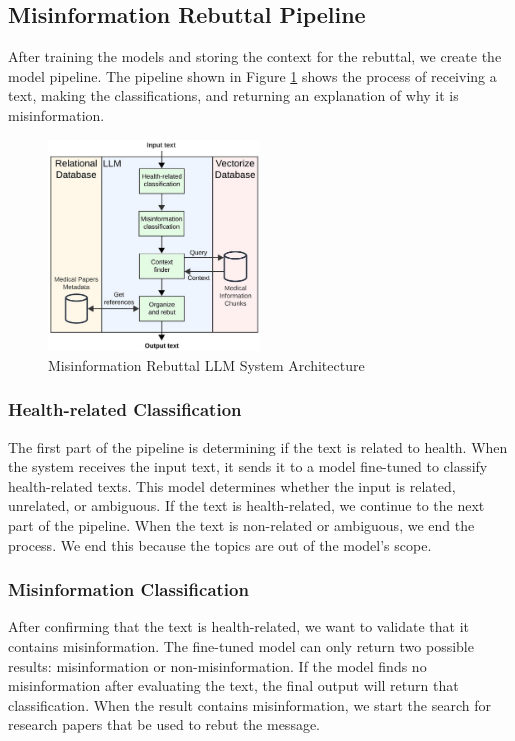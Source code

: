 \subsection{Misinformation Rebuttal Pipeline}
After training the models and storing the context for the rebuttal, we create the model pipeline. The pipeline shown in Figure \ref{fig:llm} shows the process of receiving a text, making the classifications, and returning an explanation of why it is misinformation.

\begin{figure}[h]
	\begin{center}
		\includegraphics[width=0.5\textwidth]{figures/LLM_Pipeline.jpeg} %
	\end{center}
	\caption{Misinformation Rebuttal LLM System Architecture} %
	\label{fig:llm}
\end{figure}


\subsubsection{Health-related Classification}
The first part of the pipeline is determining if the text is related to health. When the system receives the input text, it sends it to a model fine-tuned to classify health-related texts. This model determines whether the input is related, unrelated, or ambiguous.
If the text is health-related, we continue to the next part of the pipeline. When the text is non-related or ambiguous, we end the process. We end this because the topics are out of the model's scope. 

\subsubsection{Misinformation Classification}
After confirming that the text is health-related, we want to validate that it contains misinformation. The fine-tuned model can only return two possible results: misinformation or non-misinformation. If the model finds no misinformation after evaluating the text,
the final output will return that classification. When the result contains misinformation, we start the search for research papers that be used to rebut the message.

